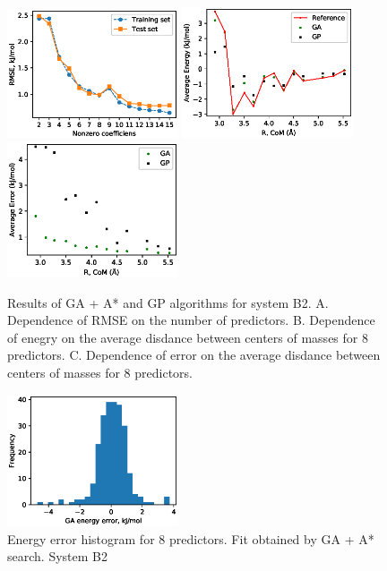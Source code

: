 \documentclass[aip,jcp,reprint,amsmath,amssymb,nature]{revtex4-1}
\begin{document}
\begin{figure}
\includegraphics[width=0.45\textwidth]{media/B2_GA_PATH_RMSE.eps}
\includegraphics[width=0.45\textwidth]{media/B2_Energy_8_predictors.eps}
\includegraphics[width=0.45\textwidth]{media/B2_Error_8_predictors.eps}
\caption{Results of GA + A* and GP algorithms for system B2.  A. Dependence of RMSE on the number of predictors. B. Dependence of enegry on the average disdance between centers of masses for 8 predictors. C. Dependence of error on the average disdance between centers of masses for 8 predictors.}\label{Fig:B2}
\end{figure}

\begin{figure}
\includegraphics[width=0.45\textwidth]{media/B2_GA_energy_error_histogram_8_predictors.eps}
\caption{Energy error histogram for 8 predictors. Fit obtained by GA + A* search. System B2}\label{Fig:B2_histogram_12_predictors}
\end{figure}
\end{document}
